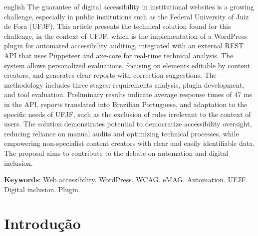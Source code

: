 \documentclass[
	article,			%
	12pt,				%
	oneside,			%
	a4paper,			%
	section=TITLE,		%
	subsection=TITLE,	%
	english,			%
	brazil,				%
	sumario=tradicional
	]{abntex2}
\begin{document}
\renewcommand{\resumoname}{Abstract}
\begin{resumoumacoluna}
    \begin{otherlanguage*}{english}
        The guarantee of digital accessibility in institutional websites is a
        growing challenge, especially in public institutions such as the Federal
        University of Juiz de Fora (UFJF). This article presents the technical
        solution found for this challenge, in the context of UFJF, which is the
        implementation of a WordPress plugin for automated accessibility auditing,
        integrated with an external REST API that uses Puppeteer and axe-core for
        real-time technical analysis. The system allows personalized evaluations,
        focusing on elements editable by content creators, and generates clear
        reports with correction suggestions. The methodology includes three stages:
        requirements analysis, plugin development, and tool evaluation. Preliminary
        results indicate average response times of 47 ms in the API, reports
        translated into Brazilian Portuguese, and adaptation to the specific
        needs of UFJF, such as the exclusion of rules irrelevant to the context of
        users. The solution demonstrates potential to democratize accessibility
        oversight, reducing reliance on manual audits and optimizing technical
        processes, while empowering non-specialist content creators with clear and
        easily identifiable data. The proposal aims to contribute to the debate on
        automation and digital inclusion.

        \vspace{\onelineskip}

        \noindent
        \textbf{Keywords}: Web accessibility. WordPress. WCAG. eMAG. Automation. UFJF. Digital inclusion. Plugin.
    \end{otherlanguage*}
\end{resumoumacoluna}

\textual

\chapter*{Introdução}
\end{document}
